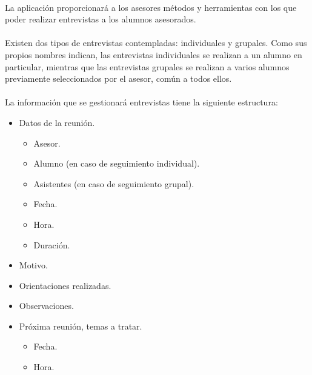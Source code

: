       \paragraph{}La aplicación proporcionará a los asesores métodos y
      herramientas con los que poder realizar entrevistas a los alumnos
      asesorados.

      \paragraph{}Existen dos tipos de entrevistas contempladas: individuales y
      grupales. Como sus propios nombres indican, las entrevistas individuales
      se realizan a un alumno en particular, mientras que las entrevistas
      grupales se realizan a varios alumnos previamente seleccionados por el
      asesor, común a todos ellos.

      \paragraph{}La información que se gestionará entrevistas tiene la
      siguiente estructura:

      \begin{itemize}
         \item Datos de la reunión.
         \begin{itemize}
            \item Asesor.
            \item Alumno (en caso de seguimiento individual).
            \item Asistentes (en caso de seguimiento grupal).
            \item Fecha.
            \item Hora.
            \item Duración.
         \end{itemize}
         \item Motivo.
         \item Orientaciones realizadas.
         \item Observaciones.
         \item Próxima reunión, temas a tratar.
         \begin{itemize}
            \item Fecha.
            \item Hora.
         \end{itemize}
      \end{itemize}

